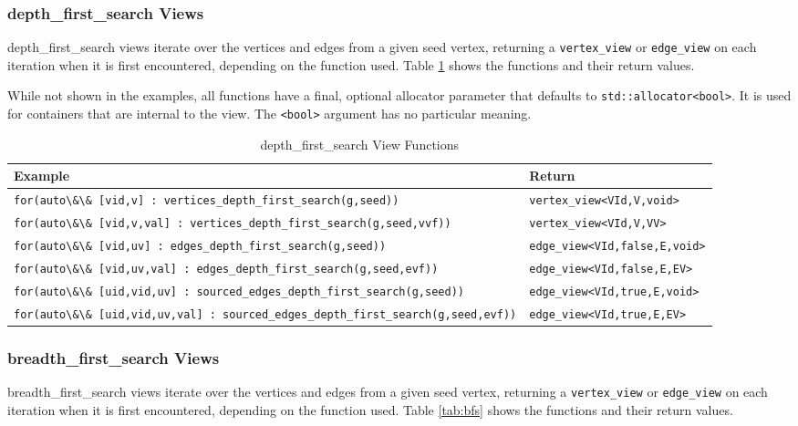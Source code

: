 \documentclass[10pt,onecolumn]{article}
\newcommand{\tcode}[1]{\lstinline[breaklines=true]{#1}}
\begin{document}
\subsubsection{depth\_first\_search Views}
depth\_first\_search views iterate over the vertices and edges from a given seed vertex, returning a \tcode{vertex_view} or \tcode{edge_view} on each iteration when it is first encountered, depending on the function used. 
Table \ref{tab:dfs} shows the functions and their return values.

While not shown in the examples, all functions have a final, optional allocator parameter that defaults to \tcode{std::allocator<bool>}. It is used for containers that are internal to the view. The \tcode{<bool>} argument has no particular meaning.

\begin{table}[h!]
\begin{center}
\resizebox{\textwidth}{!}
{\begin{tabular}{l l}
\hline
    \textbf{Example} & \textbf{Return} \\
\hline
    \tcode{for(auto\&\& [vid,v] : vertices_depth_first_search(g,seed))} & \tcode{vertex_view<VId,V,void>} \\
    \tcode{for(auto\&\& [vid,v,val] : vertices_depth_first_search(g,seed,vvf))} & \tcode{vertex_view<VId,V,VV>} \\
\hline
    \tcode{for(auto\&\& [vid,uv] : edges_depth_first_search(g,seed))} & \tcode{edge_view<VId,false,E,void>} \\
    \tcode{for(auto\&\& [vid,uv,val] : edges_depth_first_search(g,seed,evf))} & \tcode{edge_view<VId,false,E,EV>} \\
\hline
    \tcode{for(auto\&\& [uid,vid,uv] : sourced_edges_depth_first_search(g,seed))} & \tcode{edge_view<VId,true,E,void>} \\
    \tcode{for(auto\&\& [uid,vid,uv,val] : sourced_edges_depth_first_search(g,seed,evf))} & \tcode{edge_view<VId,true,E,EV>} \\
\hline
\end{tabular}}
\caption{depth\_first\_search View Functions}
\label{tab:dfs}
\end{center}
\end{table}

\subsubsection{breadth\_first\_search Views}
breadth\_first\_search views iterate over the vertices and edges from a given seed vertex, returning a \tcode{vertex_view} or \tcode{edge_view} on each iteration when it is first encountered, depending on the function used. 
Table \ref{tab:bfs} shows the functions and their return values.
\end{document}
